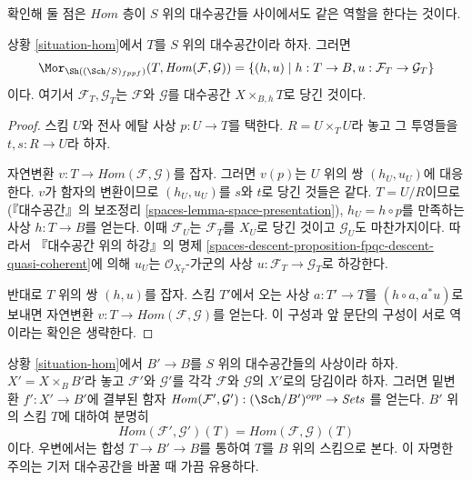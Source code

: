 \noindent
확인해 둘 점은 $\mathit{Hom}$ 층이 $S$ 위의 대수공간들 사이에서도
같은 역할을 한다는 것이다.

\begin{lemma}
\label{lemma-extend-hom-to-spaces}
상황 \ref{situation-hom}에서 $T$를 $S$ 위의 대수공간이라 하자.
그러면
$$
\Mor_{\Sh((\Sch/S)_{fppf})}(T, \mathit{Hom}(\mathcal{F}, \mathcal{G})) =
\{(h, u) \mid h : T \to B, u : \mathcal{F}_T \to \mathcal{G}_T\}
$$
이다. 여기서 $\mathcal{F}_T, \mathcal{G}_T$는
$\mathcal{F}$와 $\mathcal{G}$를 대수공간
$X \times_{B, h} T$로 당긴 것이다.
\end{lemma}

\begin{proof}
스킴 $U$와 전사 에탈 사상 $p : U \to T$를 택한다.
$R = U \times_T U$라 놓고 그 투영들을 $t, s : R \to U$라 하자.

\medskip\noindent
자연변환 $v : T \to \mathit{Hom}(\mathcal{F}, \mathcal{G})$를
잡자. 그러면 $v(p)$는 $U$ 위의 쌍 $(h_U, u_U)$에 대응한다.
$v$가 함자의 변환이므로 $(h_U, u_U)$를 $s$와 $t$로 당긴 것들은 같다.
$T = U/R$이므로(『대수공간』의 보조정리
\ref{spaces-lemma-space-presentation}), $h_U = h \circ p$를 만족하는
사상 $h : T \to B$를 얻는다. 이때 $\mathcal{F}_U$는
$\mathcal{F}_T$를 $X_U$로 당긴 것이고 $\mathcal{G}_U$도 마찬가지이다.
따라서 『대수공간 위의 하강』의 명제
\ref{spaces-descent-proposition-fpqc-descent-quasi-coherent}에 의해
$u_U$는 $\mathcal{O}_{X_T}$-가군의 사상
$u : \mathcal{F}_T \to \mathcal{G}_T$로 하강한다.

\medskip\noindent
반대로 $T$ 위의 쌍 $(h, u)$를 잡자. 스킴 $T'$에서 오는 사상
$a : T' \to T$를 $(h \circ a, a^*u)$로 보내면 자연변환
$v : T \to \mathit{Hom}(\mathcal{F}, \mathcal{G})$를 얻는다.
이 구성과 앞 문단의 구성이 서로 역이라는 확인은 생략한다.
\end{proof}

\begin{remark}
\label{remark-hom-base-change}
상황 \ref{situation-hom}에서 $B' \to B$를 $S$ 위의 대수공간들의
사상이라 하자. $X' = X \times_B B'$라 놓고
$\mathcal{F}'$와 $\mathcal{G}'$를 각각
$\mathcal{F}$와 $\mathcal{G}$의 $X'$로의 당김이라 하자.
그러면 밑변환 $f' : X' \to B'$에 결부된 함자
$\mathit{Hom}(\mathcal{F}', \mathcal{G}') : (\Sch/B')^{opp} \to \textit{Sets}$
를 얻는다. $B'$ 위의 스킴 $T$에 대하여 분명히
$$
\mathit{Hom}(\mathcal{F}', \mathcal{G}')(T) =
\mathit{Hom}(\mathcal{F}, \mathcal{G})(T)
$$
이다. 우변에서는 합성 $T \to B' \to B$를 통하여 $T$를 $B$ 위의
스킴으로 본다. 이 자명한 주의는 기저 대수공간을 바꿀 때 가끔 유용하다.
\end{remark}


